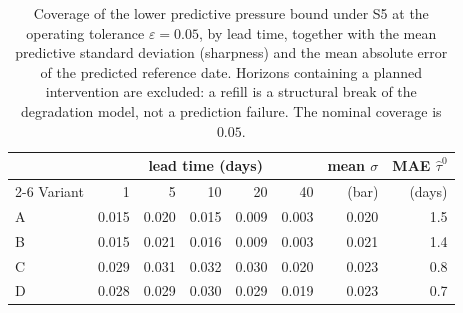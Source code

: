 \begin{table}[htbp]
\centering
\caption{Coverage of the lower predictive pressure bound under S5 at the
operating tolerance $\varepsilon=0.05$, by lead time, together with the mean
predictive standard deviation (sharpness) and the mean absolute error of the
predicted reference date. Horizons containing a planned intervention are
excluded: a refill is a structural break of the degradation model, not a
prediction failure. The nominal coverage is $0.05$.}
\label{tab:ch6-calibration}
\begin{tabular}{@{}lrrrrrrr@{}}
\toprule
& \multicolumn{5}{c}{lead time (days)} & mean $\sigma$ & MAE $\widehat{\tau}^0$ \\
\cmidrule(r){2-6}
Variant & 1 & 5 & 10 & 20 & 40 & (bar) & (days) \\
\midrule

A & 0.015 & 0.020 & 0.015 & 0.009 & 0.003 & 0.020 & 1.5 \\
B & 0.015 & 0.021 & 0.016 & 0.009 & 0.003 & 0.021 & 1.4 \\
C & 0.029 & 0.031 & 0.032 & 0.030 & 0.020 & 0.023 & 0.8 \\
D & 0.028 & 0.029 & 0.030 & 0.029 & 0.019 & 0.023 & 0.7 \\
\bottomrule
\end{tabular}
\end{table}
